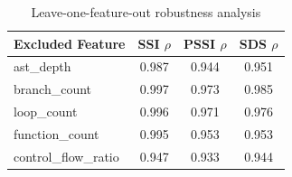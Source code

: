 \begin{table}[t]
\centering
\caption{Leave-one-feature-out robustness analysis}
\label{tab:feature_ablation}
\begin{tabular}{lccc}
\toprule
Excluded Feature & SSI $\rho$ & PSSI $\rho$ & SDS $\rho$ \\
\midrule
ast\_depth & 0.987 & 0.944 & 0.951 \\
branch\_count & 0.997 & 0.973 & 0.985 \\
loop\_count & 0.996 & 0.971 & 0.976 \\
function\_count & 0.995 & 0.953 & 0.953 \\
control\_flow\_ratio & 0.947 & 0.933 & 0.944 \\
\bottomrule
\end{tabular}
\end{table}
